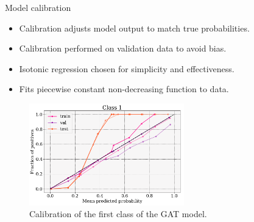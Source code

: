 \documentclass{beamer}
\begin{document}
\begin{frame}{Model calibration}
    \begin{itemize}
        \item Calibration adjusts model output to match true probabilities.
        \item Calibration performed on validation data to avoid bias.
        \item Isotonic regression chosen for simplicity and effectiveness.
        \item Fits piecewise constant non-decreasing function to data.
    \end{itemize}

    \begin{figure}[H]
        \centering
        \includegraphics[width=0.6\textwidth]{figures/small_calibration.png}
        \caption{Calibration of the first class of the GAT model.}
        \label{fig:calibration}
    \end{figure}
\end{frame}
\end{document}

